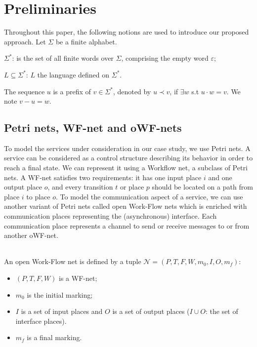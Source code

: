 \section{Preliminaries}
Throughout this paper, the following notions are used to introduce our proposed approach.
Let $\Sigma$ be a finite alphabet.
\small
\begin{compactitem}
	\item $\Sigma^*$: is the set of all finite words over $\Sigma$, comprising the empty word $\varepsilon$;
	\item $L \subseteq \Sigma^*$: $L$ the language defined on $\Sigma^*$.
\end{compactitem}
The sequence $u$ is a prefix of  $v \in \Sigma^*$, denoted by $u \prec v$, if $\exists w$ s.t $u \cdot w = v$. We note $v-u=w$.
\subsection{Petri nets, WF-net and oWF-nets}
To model the services under consideration in our case study, we use Petri nets. A service can be considered as a control structure describing its behavior in order to reach a final state. We can represent it using a Workflow net, a subclass of Petri nets. A WF-net satisfies two requirements: it has one input place $i$ and one output place $o$, and every transition $t$ or place $p$ should be located on a path from place $i$ to place $o$. To model the communication aspect of a service, we can use another variant of Petri nets called open Work-Flow nets which is enriched with communication places representing the (asynchronous) interface. Each communication place represents a channel to send or receive messages to or from another oWF-net. 
\begin{definition} \mbox{} \\
\small
	An open Work-Flow net is defined by a tuple $\mathcal{N} = (P, T, F,W,m_0, I,O,m_f)$:
	\vspace{-0.3cm}
	\begin{itemize}
		\item $(P, T, F, W)$ is a WF-net;
		\item $m_0$ is the initial marking;
		\item $I$ is a set of input places and $O$ is a set of output places ($I\cup O$: the set of interface places). 
		\item $m_f$ is a final marking.
	\end{itemize}
\end{definition}

